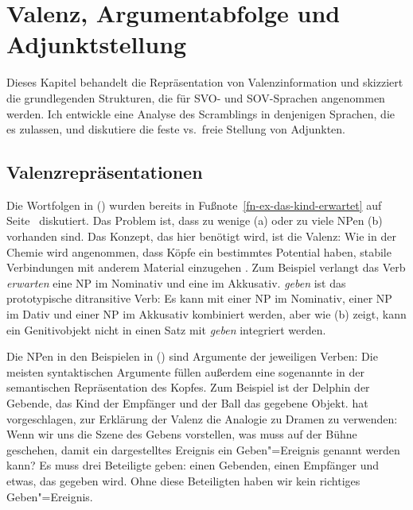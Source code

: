 \chapter{Valenz, Argumentabfolge und Adjunktstellung}
\label{chap-valence}

Dieses Kapitel behandelt die Repräsentation von Valenzinformation und skizziert die grundlegenden Strukturen, die
für SVO- und SOV-Sprachen angenommen werden. Ich entwickle eine Analyse des Scramblings in denjenigen Sprachen, die
es zulassen, und diskutiere die feste vs.\ freie Stellung von Adjunkten.

\section{Valenzrepräsentationen}
\label{sec-valence}

Die Wortfolgen in () wurden bereits in Fußnote~\ref{fn-ex-das-kind-erwartet} auf
Seite~\pageref{fn-ex-das-kind-erwartet} diskutiert.
\eal
{}
\zl
Das Problem ist, dass zu wenige (a) oder zu viele NPen (b) vorhanden sind. Das Konzept,
das hier benötigt wird, ist die Valenz: Wie in der Chemie wird angenommen, dass Köpfe ein bestimmtes Potential
haben, stabile Verbindungen mit anderem Material einzugehen \citep[]{Tesniere2015a-u}. Zum Beispiel
verlangt das Verb \emph{erwarten} eine NP im Nominativ und eine im
Akkusativ. \emph{geben} ist das prototypische ditransitive Verb: Es kann mit einer
NP im Nominativ, einer NP im Dativ und einer NP im Akkusativ kombiniert werden, aber wie (b) zeigt, kann ein
Genitivobjekt nicht in einen Satz mit \emph{geben} integriert werden.

Die NPen in den Beispielen in () sind Argumente der jeweiligen Verben:
\eal
{}
\zl
Die meisten syntaktischen Argumente füllen außerdem eine sogenannte  in der semantischen Repräsentation des
Kopfes. Zum Beispiel ist der Delphin der Gebende, das Kind der Empfänger und der Ball das gegebene
Objekt. \citet[Kapitel~48]{Tesniere2015a-u} hat vorgeschlagen, zur Erklärung der Valenz die Analogie zu Dramen zu verwenden: Wenn wir
uns die Szene des Gebens vorstellen, was muss auf der Bühne geschehen, damit ein dargestelltes Ereignis ein Geben"=Ereignis
genannt werden kann? Es muss drei Beteiligte geben: einen Gebenden, einen Empfänger und etwas, das
gegeben wird. Ohne diese Beteiligten haben wir kein richtiges Geben"=Ereignis.

